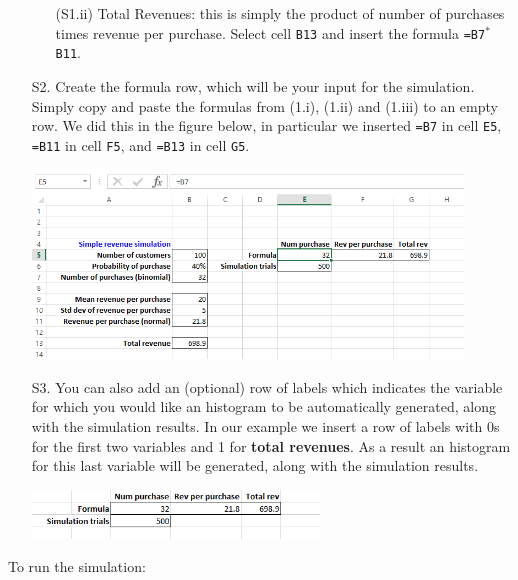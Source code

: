 \documentclass[12pt]{article}
\begin{document}
\begin{itemize}
\begin{itemize}
\item[(S1.ii)] Total Revenues: this is simply the product of number of purchases times revenue per purchase. Select cell \texttt{B13} and insert the formula \texttt{=B7$^*$B11}.
\end{itemize}

\item [S2.] Create the formula row, which will be your input for the simulation. Simply copy and paste the formulas from (1.i), (1.ii) and (1.iii) to an empty row. We did this in the figure below, in particular we inserted \texttt{=B7} in cell \texttt{E5}, \texttt{=B11} in cell \texttt{F5}, and \texttt{=B13} in cell \texttt{G5}.

\centerline{\includegraphics[width=4.5in]{figures/simul4.png}}

\item[S3.] You can also add an (optional) row of labels which indicates the variable for which you would like an histogram to be automatically generated, along with the simulation results. In our example we insert a row of labels with 0s for the first two variables and 1 for \textbf{total revenues}. As a result an histogram for this last variable will be generated, along with the simulation results.


\medskip

\vspace*{.1cm}
\centerline{\includegraphics[width=3in]{figures/simul5.png}}
\end{itemize}

To run the simulation:
\end{document}
